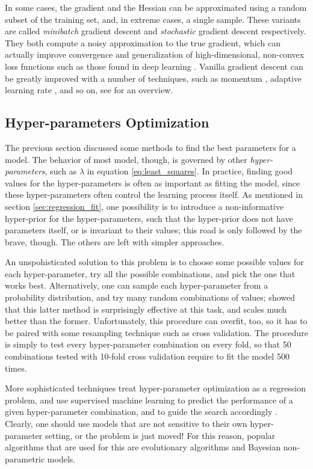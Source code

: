 \documentclass[a4paper,11pt]{kth-mag}
\begin{document}
In some cases, the gradient and the Hessian can be approximated using a random subset of the training set, and, in extreme cases, a single sample. These variants are called \emph{minibatch} gradient descent and \emph{stochastic} gradient descent respectively. They both compute a noisy approximation to the true gradient, which can actually improve convergence and generalization of high-dimensional, non-convex loss functions such as those found in deep learning \citep{sgd_noise, bayesian_sgd}. Vanilla gradient descent can be greatly improved with a number of techniques, such as momentum \citep{gd_momentum}, adaptive learning rate \citep{adagrad, adadelta, adam}, and so on, see \cite{gd_overview} for an overview. 

\subsection{Hyper-parameters Optimization}
The previous section discussed some methods to find the best parameters for a model. The behavior of most model, though, is governed by other \emph{hyper-parameters}, such as $\lambda$ in equation \ref{eq:least_squares}. In practice, finding good values for the hyper-parameters is often as important as fitting the model, since these hyper-parameters often control the learning process itself. As mentioned in section \ref{sec:regression_fit}, one possibility is to introduce a non-informative hyper-prior for the hyper-parameters, such that the hyper-prior does not have parameters itself, or is invariant to their values; this road is only followed by the brave, though. The others are left with simpler approaches.

An unspohisticated solution to this problem is to choose some possible values for each hyper-parameter, try all the possible combinations, and pick the one that works best. Alternatively, one can sample each hyper-parameter from a probability distribution, and try many random combinations of values; \cite{random_search} showed that this latter method is surprisingly effective at this task, and scales much better than the former. Unfortunately, this procedure can overfit, too, so it has to be paired with some resampling technique such as cross validation. The procedure is simply to test every hyper-parameter combination on every fold, so that 50 combinations tested with 10-fold cross validation require to fit the model 500 times.

More sophisticated techniques treat hyper-parameter optimization as a regression problem, and use supervised machine learning to predict the performance of a given hyper-parameter combination, and to guide the search accordingly \citep{hyperopt}. Clearly, one should use models that are not sensitive to their own hyper-parameter setting, or the problem is just moved! For this reason, popular algorithms that are used for this are evolutionary algorithms and Bayesian non-parametric models.
\end{document}
